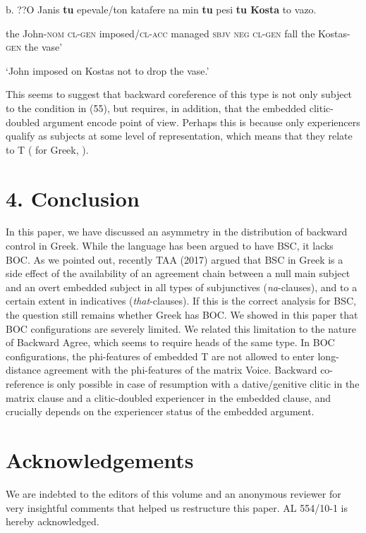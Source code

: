 \documentclass[output=paper]{langsci/langscibook}
\begin{document}
  b.  ??O    Janis    \textbf{tu}  epevale/ton katafere   na min  \textbf{tu} pesi  \textbf{tu  Kosta}     to vazo.

the John{}-\textsc{nom}   \textsc{cl-gen}  imposed/\textsc{cl-acc} managed  \textsc{sbjv neg cl-gen}  fall   the Kostas{}-\textsc{gen} the vase’

    ‘John imposed on Kostas not to drop the vase.’

This seems to suggest that backward coreference of this type is not only subject to the condition in (55), but requires, in addition, that the embedded clitic-doubled argument encode point of view. Perhaps this is because only experiencers qualify as subjects at some level of representation, which means that they relate to T (\citealt{Anagnostopoulou1999} for Greek, \citealt{Landau2010}). 

\section{ 4. Conclusion}

In this paper, we have discussed an asymmetry in the distribution of backward control in Greek. While the language has been argued to have BSC, it lacks BOC. As we pointed out, recently TAA (2017) argued that BSC in Greek is a side effect of the availability of an agreement chain between a null main subject and an overt embedded subject in all types of subjunctives (\textit{na}{}-clauses), and to a certain extent in indicatives (\textit{that}{}-clauses). If this is the correct analysis for BSC, the question still remains whether Greek has BOC. We showed in this paper that BOC configurations are severely limited. We related this limitation to the nature of Backward Agree, which seems to require heads of the same type. In BOC configurations, the phi-features of embedded T are not allowed to enter long-distance agreement with the phi-features of the matrix Voice. Backward co-reference is only possible in case of resumption with a dative/genitive clitic in the matrix clause and a clitic-doubled experiencer in the embedded clause, and crucially depends on the experiencer status of the embedded argument.

\section{ Acknowledgements}

We are indebted to the editors of this volume and an anonymous reviewer for very insightful comments that helped us restructure this paper. AL 554/10-1 is hereby acknowledged.
\end{document}
